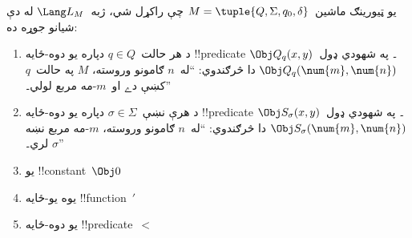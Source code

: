 \documentclass[../../../include/open-logic-section]{subfiles}
\begin{document}
\begin{defn}
يو ټيورينګ ماشين~$M = \tuple{Q, \Sigma, q_0, \delta}$ چې راکړل شي،
ژبه~$\Lang L_M$ له دې شيانو جوړه ده:
\begin{enumerate}
\item د هر حالت~$q \in Q$ دپاره يو دوه-ځايه !!{predicate}
  $\Obj Q_q(x, y)$۔ په شهودي ډول~$\Obj Q_q(\num{m}, \num{n})$ دا
  څرګندوي: ``له~$n$ ګامونو وروسته، $M$ په حالت~$q$ کښې دے او~$m$-مه
  مربع لولي۔''
\item د هرې نښې~$\sigma\in \Sigma$ دپاره يو دوه-ځايه !!{predicate}
  $\Obj S_\sigma(x, y)$۔ په شهودي ډول~$\Obj S_\sigma(\num{m},
  \num{n})$ دا څرګندوي: ``له~$n$ ګامونو وروسته، $m$-مه مربع نښه
  $\sigma$ لري۔''
\item يو !!{constant}~$\Obj 0$
\item يوه يو-ځايه !!{function}~$\prime$
\item يو دوه-ځايه !!{predicate}~$<$
\end{enumerate}
\end{defn}
\end{document}
